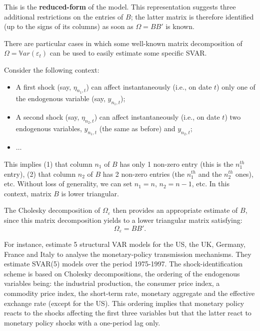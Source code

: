 \documentclass[
  12pt,
]{book}
\providecommand{\tightlist}{%
  \setlength{\itemsep}{0pt}\setlength{\parskip}{0pt}}
\theoremstyle{definition}
\theoremstyle{definition}
\theoremstyle{definition}
\theoremstyle{definition}
\theoremstyle{remark}
\begin{document}
This is the \textbf{reduced-form} of the model. This representation suggests three additional restrictions on the entries of \(B\); the latter matrix is therefore identified (up to the signs of its columns) as soon as \(\Omega = BB'\) is known.

There are particular cases in which some well-known matrix decomposition of \(\Omega=\mathbb{V}ar(\varepsilon_t)\) can be used to easily estimate some specific SVAR.

Consider the following context:

\begin{itemize}
\tightlist
\item
  A first shock (say, \(\eta_{n_1,t}\)) can affect instantaneously
  (i.e., on date \(t\)) only one of the endogenous variable (say, \(y_{n_1,t}\));
\item
  A second shock (say, \(\eta_{n_2,t}\)) can affect instantaneously
  (i.e., on date \(t\)) two endogenous variables, \(y_{n_1,t}\) (the same as before) and \(y_{n_2,t}\);
\item
  \(\dots\)
\end{itemize}

This implies (1) that column \(n_1\) of \(B\) has only 1 non-zero entry (this is the \(n_1^{th}\) entry), (2) that column \(n_2\) of \(B\) has 2 non-zero entries (the \(n_1^{th}\) and the \(n_2^{th}\) ones), etc. Without loss of generality, we can set \(n_1=n\), \(n_2=n-1\), etc. In this context, matrix \(B\) is lower triangular.

The Cholesky decomposition of \(\Omega_{\varepsilon}\) then provides an appropriate estimate of \(B\), since this matrix decomposition yields to a lower triangular matrix satisfying:
\[
\Omega_\varepsilon = BB'.
\]

For instance, \citet{DEDOLA20051543} estimate 5 structural VAR models for the US, the UK, Germany, France and Italy to analyse the monetary-policy transmission mechanisms. They estimate SVAR(5) models over the period 1975-1997. The shock-identification scheme is based on Cholesky decompositions, the ordering of the endogenous variables being: the industrial production, the consumer price index, a commodity price index, the short-term rate, monetary aggregate and the effective exchange rate (except for the US). This ordering implies that monetary policy reacts to the shocks affecting the first three variables but that the latter react to monetary policy shocks with a one-period lag only.
\end{document}
